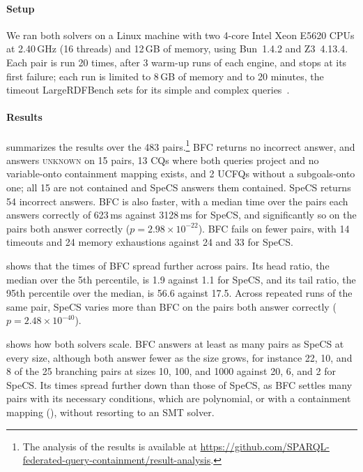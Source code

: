 \paragraph{Setup}
We ran both solvers on a Linux machine with two 4-core Intel Xeon E5620 CPUs at 2.40\,GHz (16 threads) and 12\,GB of memory, using Bun~1.4.2 and Z3~4.13.4.
Each pair is run 20 times, after 3 warm-up runs of each engine, and stops at its first failure; each run is limited to 8\,GB of memory and to 20 minutes, the timeout LargeRDFBench sets for its simple and complex queries~\cite[Sec.~5.1]{saleem2018largerdfbench}.

\paragraph{Results}


 summarizes the results over the 483 pairs.\footnote{The analysis of the results is available at \url{https://github.com/SPARQL-federated-query-containment/result-analysis}.}
\ac{BFC} returns no incorrect answer, and answers \textsc{unknown} on 15 pairs, 13 \acp{CQ} where both queries project and no variable-onto containment mapping exists, and 2 \acp{UCFQ} without a subgoals-onto one; all 15 are not contained and SpeCS answers them contained.
SpeCS returns 54 incorrect answers.
\ac{BFC} is also faster, with a median time over the pairs each answers correctly of 623\,ms against 3128\,ms for SpeCS, and significantly so on the pairs both answer correctly ($p = 2.98 \times 10^{-22}$).
\ac{BFC} fails on fewer pairs, with 14 timeouts and 24 memory exhaustions against 24 and 33 for SpeCS.

 shows that the times of \ac{BFC} spread further across pairs.
Its head ratio, the median over the 5th percentile, is 1.9 against 1.1 for SpeCS, and its tail ratio, the 95th percentile over the median, is 56.6 against 17.5.
Across repeated runs of the same pair, SpeCS varies more than \ac{BFC} on the pairs both answer correctly ($p = 2.48 \times 10^{-40}$).

 shows how both solvers scale.
\ac{BFC} answers at least as many pairs as SpeCS at every size, although both answer fewer as the size grows, for instance 22, 10, and 8 of the 25 branching pairs at sizes 10, 100, and 1000 against 20, 6, and 2 for SpeCS.
Its times spread further down than those of SpeCS, as \ac{BFC} settles many pairs with its necessary conditions, which are polynomial, or with a containment mapping (), without resorting to an SMT solver.

